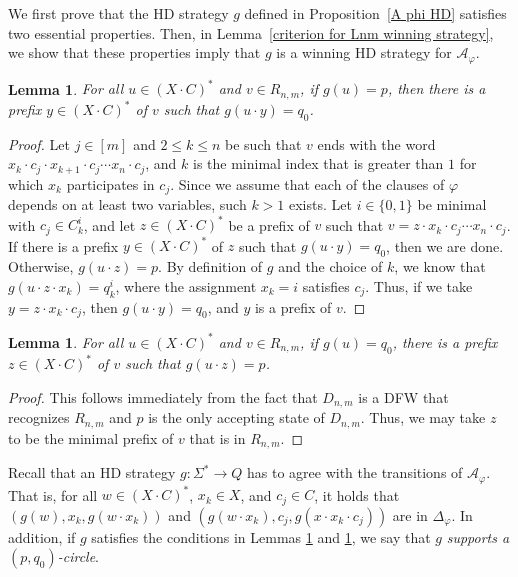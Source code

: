 \documentclass[10pt,a4paper]{amsart}
\newtheorem{lem}[thm]{Lemma}
\theoremstyle{definition}
\numberwithin{equation}{section}
\newcommand{\A}{{\mathcal A}}
\begin{document}
We first prove that the HD strategy $g$ defined in Proposition~\ref{A phi HD} satisfies two essential properties. Then, in Lemma~\ref{criterion for Lnm winning strategy}, we show that these properties imply that $g$ is a winning HD strategy for $\A_\varphi$.

\begin{lem}\label{Lnm strategy from p takes us to q_0}
	For all $u\in (X\cdot C)^*$ and $v\in R_{n,m}$, if $g(u)=p$, then there is a prefix $y\in (X\cdot C)^*$ of $v$ such that $g(u\cdot y)=q_0$.
\end{lem}

\begin{proof}
	Let $j\in [m]$ and $2\leq k\leq n$ be such that $v$ ends with the word $x_k\cdot c_j\cdot x_{k+1}\cdot c_j\cdots x_n\cdot c_j$, and $k$ is the minimal index that is greater than $1$ for which $x_k$ participates in $c_j$. 
	Since we assume that each of the clauses of $\varphi$ depends on at least two variables, such $k>1$ exists. 
	Let $i\in {\{0,1\}}$ be minimal with $c_j \in C_k^i$, and let $z\in (X\cdot C)^*$ be a prefix of $v$ such that $v=z\cdot x_k\cdot c_j\cdots x_n\cdot c_j$.
	If there is a prefix $y\in (X\cdot C)^*$ of $z$ such that $g(u\cdot y)=q_0$, then we are done. Otherwise, $g(u\cdot z)=p$. By definition of $g$ and the choice of $k$, we know that $g(u\cdot z\cdot x_k)=q^i_k$, where the assignment $x_k=i$ satisfies $c_j$. Thus, if we take $y=z\cdot x_k\cdot c_j$, then $g(u\cdot y)=q_0$, and $y$ is a prefix of $v$.
\end{proof}

\begin{lem}\label{Lnm strategy from q_0 takes us to p}
	For all $u\in (X\cdot C)^*$ and $v\in R_{n,m}$, if $g(u)=q_0$, there is a prefix $z\in (X\cdot C)^*$ of $v$ such that $g(u\cdot z)=p$.
\end{lem}

\begin{proof}
	This follows immediately from the fact that $D_{n,m}$ is a DFW that recognizes $R_{n,m}$ and $p$ is the only accepting state of $D_{n,m}$. Thus, we may take $z$ to be the minimal prefix of $v$ that is in $R_{n,m}$.
\end{proof}

Recall that an HD strategy $g:\Sigma^*\rightarrow Q$ has to agree with the transitions of $\A_\varphi$. That is, 
for all $w\in (X\cdot C)^*$, $x_k\in X$, and $c_j\in C$, it holds that $(g(w),x_k,g(w\cdot x_k))$ and $(g(w\cdot x_k),c_j,g(x\cdot x_k\cdot c_j))$ are in $\Delta_\varphi$. In addition, if $g$ satisfies the conditions in Lemmas \ref{Lnm strategy from p takes us to q_0} and \ref{Lnm strategy from q_0 takes us to p}, we say that $g$ {\em supports a $(p,q_0)$-circle}.  
\end{document}
